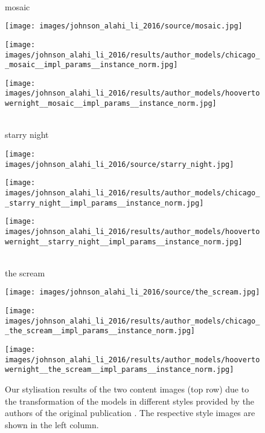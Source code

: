 \begin{figure}[H]
	\hfill \\ mosaic \hfill \\
	\begin{minipage}[t]{0.3\textwidth}
		\centering
		\texttt{[image: images/johnson\_alahi\_li\_2016/source/mosaic.jpg]}
	\end{minipage}
	\hfill%
	\begin{minipage}[t]{0.3\textwidth}
		\centering
		\texttt{[image: images/johnson\_alahi\_li\_2016/results/author\_models/chicago\_\_mosaic\_\_impl\_params\_\_instance\_norm.jpg]}
	\end{minipage}
	\hfill%
	\begin{minipage}[t]{0.3\textwidth}
		\centering
		\texttt{[image: images/johnson\_alahi\_li\_2016/results/author\_models/hoovertowernight\_\_mosaic\_\_impl\_params\_\_instance\_norm.jpg]}
	\end{minipage}
	\hfill \\ starry night \hfill \\
	\begin{minipage}[t]{0.3\textwidth}
		\centering
		\texttt{[image: images/johnson\_alahi\_li\_2016/source/starry\_night.jpg]}
	\end{minipage}
	\hfill%
	\begin{minipage}[t]{0.3\textwidth}
		\centering
		\texttt{[image: images/johnson\_alahi\_li\_2016/results/author\_models/chicago\_\_starry\_night\_\_impl\_params\_\_instance\_norm.jpg]}
	\end{minipage}
	\hfill%
	\begin{minipage}[t]{0.3\textwidth}
		\centering
		\texttt{[image: images/johnson\_alahi\_li\_2016/results/author\_models/hoovertowernight\_\_starry\_night\_\_impl\_params\_\_instance\_norm.jpg]}
	\end{minipage}
	\hfill \\ the scream \hfill \\
	\begin{minipage}[t]{0.3\textwidth}
		\centering
		\texttt{[image: images/johnson\_alahi\_li\_2016/source/the\_scream.jpg]}
	\end{minipage}
	\hfill%
	\begin{minipage}[t]{0.3\textwidth}
		\centering
		\texttt{[image: images/johnson\_alahi\_li\_2016/results/author\_models/chicago\_\_the\_scream\_\_impl\_params\_\_instance\_norm.jpg]}
	\end{minipage}
	\hfill%
	\begin{minipage}[t]{0.3\textwidth}
		\centering
		\texttt{[image: images/johnson\_alahi\_li\_2016/results/author\_models/hoovertowernight\_\_the\_scream\_\_impl\_params\_\_instance\_norm.jpg]}
	\end{minipage}
	\label{fig:johnson_alahi_li_2016_author_model_appendix}
	\caption{Our stylisation results of the two content images (top row) due to the transformation of the models in different styles provided by the authors of the original publication \cite{JAL2016}. The respective style images are shown in the left column.}
\end{figure}

